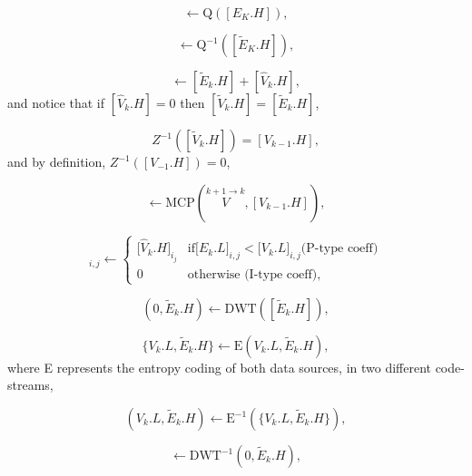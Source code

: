 \begin{equation}
  [\tilde{E}_k.H] \leftarrow \text{Q}([E_K.H]),
  \tag{d}
\end{equation}

\begin{equation}
  [\tilde{E}_k.H] \leftarrow  \text{Q}^{-1}([\tilde{E}_K.H]),
  \tag{E.g}
\end{equation}

\begin{equation}
  [\tilde{V}_k.H] \leftarrow [\tilde{E}_k.H] + [\hat{V}_k.H],
  \tag{E.h}
\end{equation}
and notice that if $[\hat{V}_k.H]=0$ then $[\tilde{V}_k.H] =
[\tilde{E}_k.H]$,

\begin{equation}
  Z^{-1}([\tilde{V}_k.H]) = [V_{k-1}.H],
  \tag{E.i}
\end{equation}
and by definition, $Z^{-1}([V_{-1}.H]) = 0$,

\begin{equation}
  [\hat{V}_k.H] \leftarrow \text{MCP}(\overset{k+1\rightarrow k}{V}, [V_{k-1}.H]),
  \tag{E.j}
\end{equation}

\begin{equation}
  [\hat{V'}_k.H]_{i,j} \leftarrow \left\{
    \begin{array}{ll}
      {[}\hat{V}_k.H{]}_{i_j}  & \text{if} {[}E_k.L{]}_{i,j} < {[}V_k.L{]}_{i,j} \text{(P-type coeff)} \\
      0                       & \text{otherwise (I-type coeff)},
    \end{array}
  \right.
  \tag{E.K}
\end{equation}
  
\begin{equation}
  (0, \tilde{E}_k.H) \leftarrow \text{DWT}([\tilde{E}_k.H]),
  \tag{f}
\end{equation}

\begin{equation}
  \{V_k.L, \tilde{E}_k.H\} \leftarrow \text{E}(V_k.L, \tilde{E}_k.H),
  \tag{g}
\end{equation}
where E represents the entropy coding of both data sources, in two
different code-streams,

\begin{equation}
  (V_k.L, \tilde{E}_k.H) \leftarrow \text{E}^{-1}(\{V_k.L, \tilde{E}_k.H\}),
  \tag{h}
\end{equation}

\begin{equation}
  [\tilde{E}_k.H] \leftarrow \text{DWT}^{-1}(0, \tilde{E}_k.H),
  \tag{i}
\end{equation}

